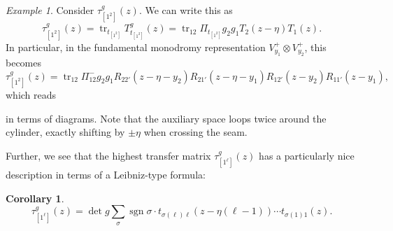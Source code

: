 \documentclass[11pt]{report}
\newtheorem{corollary}[theorem]{Corollary}
\theoremstyle{definition}
\theoremstyle{remark}
\theoremstyle{remark}
\newtheorem*{example}{Example}
\begin{document}
\begin{example}
Consider $\tau_{[1^2]}^g(z)$. We can write this as
\begin{equation*}
\tau_{[1^2]}^g(z) = \operatorname{tr}_{t_{[1^2]}} T_{t_{[1^2]}}^g(z) = \operatorname{tr}_{12} \Pi_{t_{[1^2]}} g_2 g_1 T_2(z-\eta) T_1(z).
\end{equation*}
In particular, in the fundamental monodromy representation $V_{y_1}^+ \otimes V_{y_2}^+$, this becomes
\begin{equation*}
\tau_{[1^2]}^g(z) = \operatorname{tr}_{12} \Pi_{12}^- g_2 g_1 R_{22'}(z-\eta-y_2) R_{21'}(z-\eta-y_1) R_{12'}(z-y_2) R_{11'}(z-y_1),
\end{equation*}
which reads
~\\
\begin{center}
\end{center}
in terms of diagrams. Note that the auxiliary space loops twice around the cylinder, exactly shifting by $\pm \eta$ when crossing the seam.
\end{example}

Further, we see that the highest transfer matrix $\tau_{[1^\ell]}^g(z)$ has a particularly nice description in terms of a Leibniz-type formula:

\begin{corollary}
\begin{equation*}
\tau_{[1^\ell]}^g(z) = \det g \sum_\sigma \operatorname{sgn} \sigma \cdot t_{\sigma(\ell)\ell}(z-\eta (\ell-1)) \cdots t_{\sigma(1)1}(z).
\end{equation*}
\end{corollary}
\end{document}
